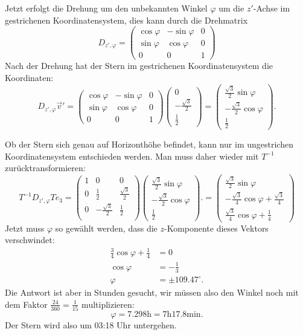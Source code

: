 \begin{loesung}
Jetzt erfolgt die Drehung um den unbekannten Winkel $\varphi$ um
die $z'$-Achse im gestrichenen Koordinatensystem, dies kann durch die
Drehmatrix
\[
D_{z',\varphi}
=
\begin{pmatrix}
\cos\varphi&-\sin\varphi&0\\
\sin\varphi& \cos\varphi&0\\
0&0&1
\end{pmatrix}
\]
Nach der Drehung hat der Stern im gestrichenen Koordinatensystem die
Koordinaten:
\[
D_{z',\varphi}\vec v'
=
\begin{pmatrix}
\cos\varphi&-\sin\varphi&0\\
\sin\varphi& \cos\varphi&0\\
0&0&1
\end{pmatrix}
\begin{pmatrix}
0\\-\frac{\sqrt{3}}2\\\frac12 
\end{pmatrix}
=
\begin{pmatrix}
\frac{\sqrt{3}}2\sin\varphi\\
-\frac{\sqrt{3}}2\cos\varphi\\
\frac12
\end{pmatrix}.
\]

Ob der Stern sich genau auf Horizonthöhe befindet, kann nur im ungestrichen
Koordinatensystem entschieden werden.
Man muss daher wieder mit $T^{-1}$ zurücktransformieren:
\[
T^{-1}D_{z',\varphi}Te_3 = 
\begin{pmatrix}
1& 0&0\\
0&\frac12&\frac{\sqrt{3}}2\\
0&-\frac{\sqrt{3}}2&\frac12\\
\end{pmatrix}
\begin{pmatrix}
\frac{\sqrt{3}}2\sin\varphi\\
-\frac{\sqrt{3}}2\cos\varphi\\
\frac12
\end{pmatrix}.
=
\begin{pmatrix}
\frac{\sqrt{3}}2\sin\varphi\\
-\frac{\sqrt{3}}4\cos\varphi+\frac{\sqrt{3}}4\\
\frac{\sqrt{3}}4\cos\varphi+\frac14
\end{pmatrix}
\]
Jetzt muss $\varphi$ so gewählt werden, dass die $z$-Komponente dieses
Vektors verschwindet:
\begin{align*}
\frac{3}4\cos\varphi+\frac14&=0\\
\cos\varphi&=-\frac1{3}\\
\varphi&=\pm 109.47^\circ.
\end{align*}
Die Antwort ist aber in Stunden gesucht, wir müssen also den Winkel
noch mit dem Faktor $\frac{24}{360}=\frac1{15}$ multiplizieren:
\[
\varphi=7.298\text{h}=7\text{h} 17.8\text{min}.
\]
Der Stern wird also um 03:18 Uhr untergehen.
\end{loesung}

